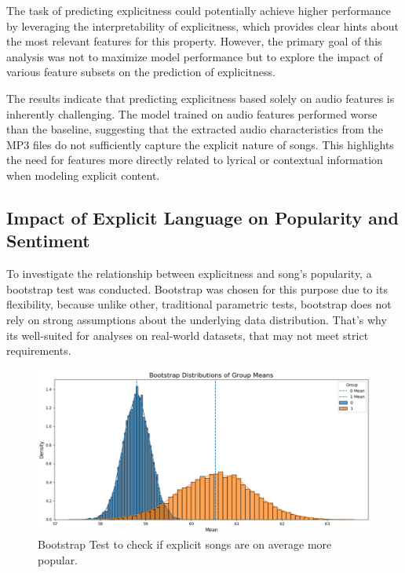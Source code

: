The task of predicting explicitness could potentially achieve higher
performance by leveraging the interpretability of explicitness, which provides
clear hints about the most relevant features for this property. However, the
primary goal of this analysis was not to maximize model performance but to
explore the impact of various feature subsets on the prediction of
explicitness.

The results indicate that predicting explicitness based solely on audio
features is inherently challenging. The model trained on audio features
performed worse than the baseline, suggesting that the extracted audio
characteristics from the MP3 files do not sufficiently capture the explicit
nature of songs. This highlights the need for features more directly related to
lyrical or contextual information when modeling explicit content.



\subsection{Impact of Explicit Language on Popularity and Sentiment}
\label{sec:explicitmorepopular}

To investigate the relationship between explicitness and song's popularity, a
bootstrap test was conducted. Bootstrap was chosen for this purpose due to its
flexibility, because unlike other, traditional parametric tests, bootstrap does
not rely on strong assumptions about the underlying data distribution. That's
why its well-suited for analyses on real-world datasets, that may not meet
strict requirements.



\begin{center}
\begin{figure}[H]
  \centering
  \includegraphics[width=5in]{img/explicitness_bootstrap.png}
  \caption{Bootstrap Test to check if explicit songs are on average more
  popular.}
  \label{Figure:fig_bh}
\end{figure}
\end{center}



